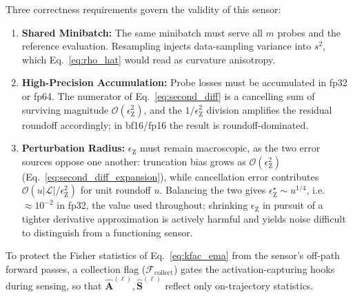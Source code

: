 \documentclass[conference]{IEEEtran}
\begin{document}
Three correctness requirements govern the validity of this sensor:
\begin{enumerate}
    \item \textbf{Shared Minibatch:} The same minibatch must serve all $m$ probes and the reference evaluation. Resampling injects data-sampling variance into $s^2$, which Eq.~\eqref{eq:rho_hat} would read as curvature anisotropy.
    \item \textbf{High-Precision Accumulation:} Probe losses must be accumulated in fp32 or fp64. The numerator of Eq.~\eqref{eq:second_diff} is a cancelling sum of surviving magnitude $\mathcal{O}(\epsilon_{\mathrm{Z}}^2)$, and the $1/\epsilon_{\mathrm{Z}}^2$ division amplifies the residual roundoff accordingly; in bf16/fp16 the result is roundoff-dominated.
    \item \textbf{Perturbation Radius:} $\epsilon_{\mathrm{Z}}$ must remain macroscopic, as the two error sources oppose one another: truncation bias grows as $\mathcal{O}(\epsilon_{\mathrm{Z}}^2)$ (Eq.~\eqref{eq:second_diff_expansion}), while cancellation error contributes $\mathcal{O}(u|\mathcal{L}|/\epsilon_{\mathrm{Z}}^2)$ for unit roundoff $u$. Balancing the two gives $\epsilon_{\mathrm{Z}}^\star \sim u^{1/4}$, i.e.\ $\approx 10^{-2}$ in fp32, the value used throughout; shrinking $\epsilon_{\mathrm{Z}}$ in pursuit of a tighter derivative approximation is actively harmful and yields noise difficult to distinguish from a functioning sensor.
\end{enumerate}
To protect the Fisher statistics of Eq.~\eqref{eq:kfac_ema} from the sensor's off-path forward passes, a collection flag ($\mathcal{F}_{\mathrm{collect}}$) gates the activation-capturing hooks during sensing, so that $\hat{\mathbf{A}}^{(\ell)}, \hat{\mathbf{S}}^{(\ell)}$ reflect only on-trajectory statistics.
\end{document}

